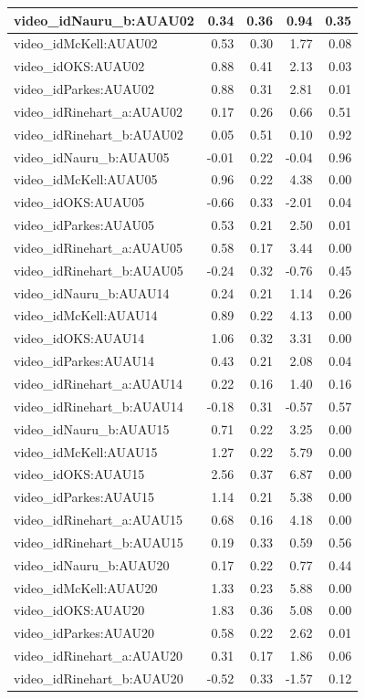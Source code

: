 \documentclass{monashthesis}
\begin{document}
\begin{tabular}{l|r|r|r|r}
\hline
video\_idNauru\_b:AUAU02 & 0.34 & 0.36 & 0.94 & 0.35\\
\hline
video\_idMcKell:AUAU02 & 0.53 & 0.30 & 1.77 & 0.08\\
\hline
video\_idOKS:AUAU02 & 0.88 & 0.41 & 2.13 & 0.03\\
\hline
video\_idParkes:AUAU02 & 0.88 & 0.31 & 2.81 & 0.01\\
\hline
video\_idRinehart\_a:AUAU02 & 0.17 & 0.26 & 0.66 & 0.51\\
\hline
video\_idRinehart\_b:AUAU02 & 0.05 & 0.51 & 0.10 & 0.92\\
\hline
video\_idNauru\_b:AUAU05 & -0.01 & 0.22 & -0.04 & 0.96\\
\hline
video\_idMcKell:AUAU05 & 0.96 & 0.22 & 4.38 & 0.00\\
\hline
video\_idOKS:AUAU05 & -0.66 & 0.33 & -2.01 & 0.04\\
\hline
video\_idParkes:AUAU05 & 0.53 & 0.21 & 2.50 & 0.01\\
\hline
video\_idRinehart\_a:AUAU05 & 0.58 & 0.17 & 3.44 & 0.00\\
\hline
video\_idRinehart\_b:AUAU05 & -0.24 & 0.32 & -0.76 & 0.45\\
\hline
video\_idNauru\_b:AUAU14 & 0.24 & 0.21 & 1.14 & 0.26\\
\hline
video\_idMcKell:AUAU14 & 0.89 & 0.22 & 4.13 & 0.00\\
\hline
video\_idOKS:AUAU14 & 1.06 & 0.32 & 3.31 & 0.00\\
\hline
video\_idParkes:AUAU14 & 0.43 & 0.21 & 2.08 & 0.04\\
\hline
video\_idRinehart\_a:AUAU14 & 0.22 & 0.16 & 1.40 & 0.16\\
\hline
video\_idRinehart\_b:AUAU14 & -0.18 & 0.31 & -0.57 & 0.57\\
\hline
video\_idNauru\_b:AUAU15 & 0.71 & 0.22 & 3.25 & 0.00\\
\hline
video\_idMcKell:AUAU15 & 1.27 & 0.22 & 5.79 & 0.00\\
\hline
video\_idOKS:AUAU15 & 2.56 & 0.37 & 6.87 & 0.00\\
\hline
video\_idParkes:AUAU15 & 1.14 & 0.21 & 5.38 & 0.00\\
\hline
video\_idRinehart\_a:AUAU15 & 0.68 & 0.16 & 4.18 & 0.00\\
\hline
video\_idRinehart\_b:AUAU15 & 0.19 & 0.33 & 0.59 & 0.56\\
\hline
video\_idNauru\_b:AUAU20 & 0.17 & 0.22 & 0.77 & 0.44\\
\hline
video\_idMcKell:AUAU20 & 1.33 & 0.23 & 5.88 & 0.00\\
\hline
video\_idOKS:AUAU20 & 1.83 & 0.36 & 5.08 & 0.00\\
\hline
video\_idParkes:AUAU20 & 0.58 & 0.22 & 2.62 & 0.01\\
\hline
video\_idRinehart\_a:AUAU20 & 0.31 & 0.17 & 1.86 & 0.06\\
\hline
video\_idRinehart\_b:AUAU20 & -0.52 & 0.33 & -1.57 & 0.12\\
\hline
\end{tabular}
\end{document}
